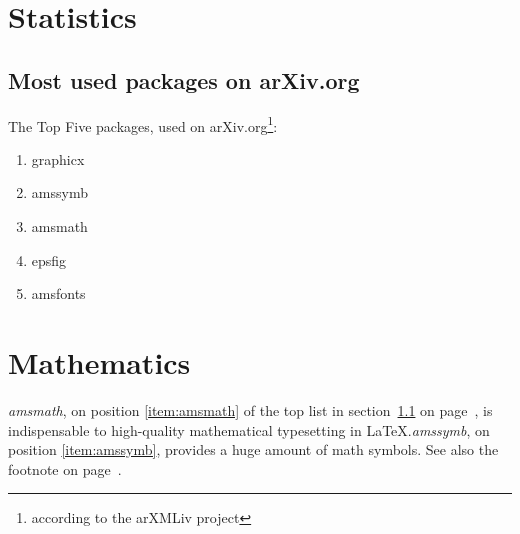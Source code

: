 \documentclass{book}
\begin{document}
\chapter{Statistics}
\section{Most used packages on arXiv.org}\label{sec:packages}
The Top Five packages, used on arXiv.org\footnote{according
to the arXMLiv project\label{fn:project}}:
\begin{enumerate}
\item graphicx
\item amssymb \label{item:amssymb}
\item amsmath \label{item:amsmath}
\item epsfig
\item amsfonts
\end{enumerate}
\chapter{Mathematics}
\emph{amsmath}, on position \ref{item:amsmath} of the top list
in section~\ref{sec:packages} on page~\pageref{sec:packages},
is indispensable to high-quality mathematical typesetting in
\LaTeX.\emph{amssymb}, on position \ref{item:amssymb},
provides a huge amount of math symbols.
See also the footnote on page~\pageref{fn:project}.
\end{document}
